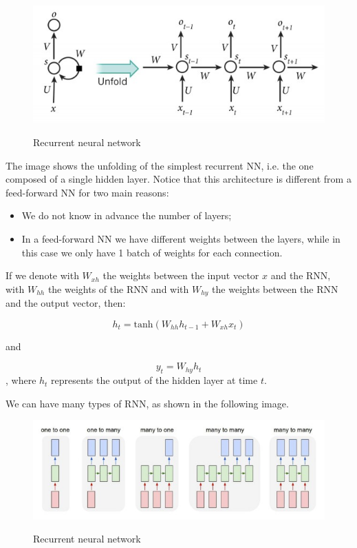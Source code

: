 \begin{figure}[h!]
		\centering
        \includegraphics[scale = 1.5]{img/rnn.jpg}
		\label{mi}
        \caption{Recurrent neural network}
\end{figure}

The image shows the unfolding of the simplest recurrent NN, i.e. the one composed of a single hidden layer. Notice that this architecture is different from a feed-forward NN for two main reasons:

\begin{itemize}
    \item We do not know in advance the number of layers;
    \item In a feed-forward NN we have different weights between the layers, while in this case we only have 1 batch of weights for each connection.
\end{itemize}

If we denote with $W_{xh}$ the weights between the input vector $x$ and the RNN, with $W_{hh}$ the weights of the RNN and with $W_{hy}$ the weights between the RNN and the output vector, then:

$$
h_t = \text{tanh} (W_{hh} h_{t-1} + W_{xh} x_t)
$$

and 

$$
y_t = W_{hy} h_t
$$
, where $h_t$ represents the output of the hidden layer at time $t$.

We can have many types of RNN, as shown in the following image.

\begin{figure}[h!]
		\centering
        \includegraphics[scale = 1.5]{img/rnn2.jpg}
		\label{mi}
        \caption{Recurrent neural network}
\end{figure}

